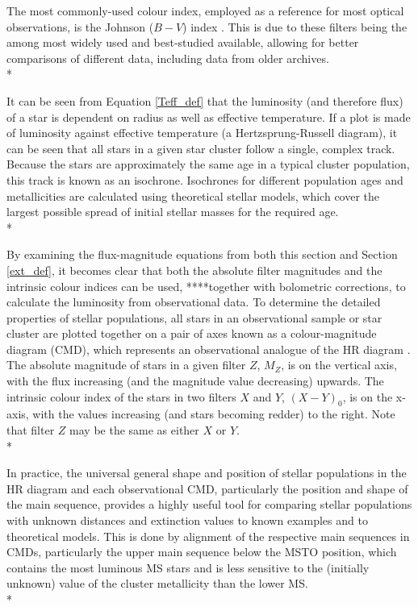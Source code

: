 \documentclass[12pt, a4paper]{report}
\begin{document}
The most commonly-used colour index, employed as a reference for most optical observations, is the Johnson ($B-V$) index \citep{1953ApJ...117..313J}. This is due to these filters being the among most widely used and best-studied available, allowing for better comparisons of different data, including data from older archives.\\*

It can be seen from Equation \ref{Teff_def} that the luminosity (and therefore flux) of a star is dependent on radius as well as effective temperature. If a plot is made of luminosity against effective temperature (a Hertzsprung-Russell diagram), it can be seen that all stars in a given star cluster follow a single, complex track. Because the stars are approximately the same age in a typical cluster population, this track is known as an isochrone. Isochrones for different population ages and metallicities are calculated using theoretical stellar models, which cover the largest possible spread of initial stellar masses for the required age.\\*

By examining the flux-magnitude equations from both this section and Section \ref{ext_def}, it becomes clear that both the absolute filter magnitudes and the intrinsic colour indices can be used, ****together with bolometric corrections, to calculate the luminosity from observational data. To determine the detailed properties of stellar populations, all stars in an observational sample or star cluster are plotted together on a pair of axes known as a colour-magnitude diagram (CMD), which represents an observational analogue of the HR diagram \citep{2005ARA&A..43..293B}. The absolute magnitude of stars in a given filter $Z$, $M_{Z}$, is on the vertical axis, with the flux increasing (and the magnitude value decreasing) upwards. The intrinsic colour index of the stars in two filters $X$ and $Y$, $(X-Y)_{0}$, is on the x-axis, with the values increasing (and stars becoming redder) to the right. Note that filter $Z$ may be the same as either $X$ or $Y$.\\*

In practice, the universal general shape and position of stellar populations in the HR diagram and each observational CMD, particularly the position and shape of the main sequence, provides a highly useful tool for comparing stellar populations with unknown distances and extinction values to known examples and to theoretical models. This is done by alignment of the respective main sequences in CMDs, particularly the upper main sequence below the MSTO position, which contains the most luminous MS stars and is less sensitive to the (initially unknown) value of the cluster metallicity than the lower MS. \\*
\end{document}
